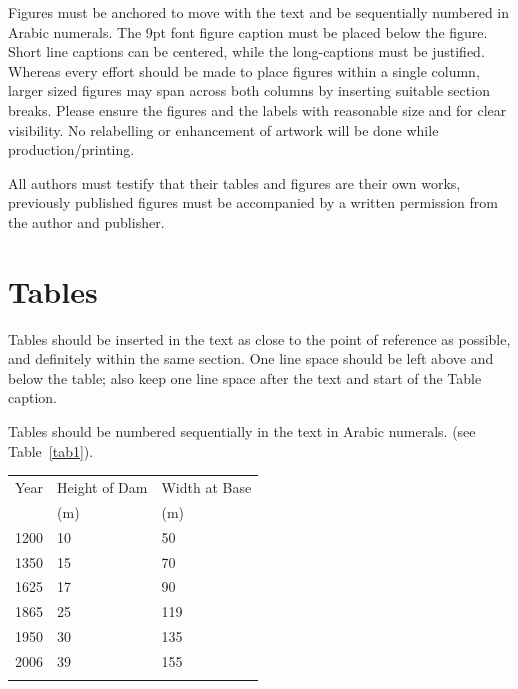 \documentclass[twocolumn]{rps-esrel2026}
\begin{document}
Figures must be anchored to move with the text and be sequentially numbered in Arabic numerals.  The 9pt font figure caption must be placed below the figure. Short
line captions can be centered, while the long-captions must be justified. Whereas every effort should be made to place figures within a single column, larger sized
figures may span across both columns by inserting suitable section breaks. Please ensure the figures and the labels with reasonable size and for clear visibility. No
relabelling or enhancement of artwork will be done while
production/printing. \cite{sample7}

All authors must testify that their tables and figures are their own works, previously published figures must be accompanied by a written permission from the author
and publisher.

\section{Tables}

Tables should be inserted in the text as close to the point of reference as possible, and definitely within the same section. One line space should be left above and
below the table; also keep one line space after the text and start of the Table caption.

Tables should be numbered sequentially in the text in Arabic
numerals. (see Table~\ref{tab1}). %


\begin{table}
{
\begin{tabular}{@{}lll@{}}\toprule 
Year & Height of  Dam & Width at Base\\
     &  (m)          &     (m)\\  \colrule

1200 & 10 & \phantom{0}50\\

1350 & 15 & \phantom{0}70\\

1625 & 17 & \phantom{0}90\\

1865 & 25 & 119\\

1950 & 30 & 135\\

2006 & 39 & 155\\\botrule
\end{tabular}}
\end{table}
\end{document}
